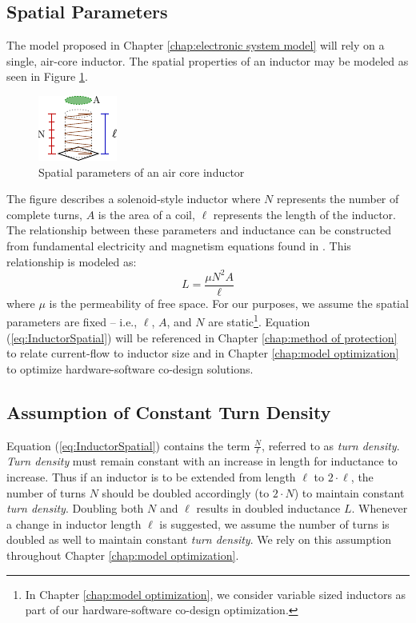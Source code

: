 \documentclass[11pt,oneside]{report}
\begin{document}
    \subsection*{Spatial Parameters}
    The model proposed in Chapter \ref{chap:electronic system model} will rely on a single, air-core inductor. The spatial properties of an inductor may be modeled as seen in Figure \ref{fig:InductorParams}.
    \begin{figure}
        \centering
        \includegraphics[width=0.25\linewidth]{img/Inductor_Parameters.pdf}
        \caption[Air Core Inductor Spatial Parameters]{Spatial parameters of an air core inductor}
        \label{fig:InductorParams}
    \end{figure}
    The figure describes a solenoid-style inductor where $N$ represents the number of complete turns, $A$ is the area of a coil, $\ell$ represents the length of the inductor. The relationship between these parameters and inductance can be constructed from fundamental electricity and magnetism equations found in \cite{uniphy}. This relationship is modeled as:
    \begin{equation}\label{eq:InductorSpatial}
    L = \frac{\mu N^{2}A}{\ell}
    \end{equation}
    where $\mu$ is the permeability of free space. For our purposes, we assume the spatial parameters are fixed -- i.e., $\ell$, $A$, and $N$ are static\footnote{In Chapter \ref{chap:model optimization}, we consider variable sized inductors as part of our hardware-software co-design optimization.}. Equation (\ref{eq:InductorSpatial}) will be referenced in Chapter \ref{chap:method of protection} to relate current-flow to inductor size and in Chapter \ref{chap:model optimization} to optimize hardware-software co-design solutions.
    \subsection*{Assumption of Constant Turn Density} \label{ssec:Assumption of Constant}
    Equation (\ref{eq:InductorSpatial}) contains the term $\frac{N}{\ell}$, referred to as \textit{turn density}. \textit{Turn density} must remain constant with an increase in length for inductance to increase. Thus if an inductor is to be extended from length $\ell$ to $2\cdot \ell$, the number of turns $N$ should be doubled accordingly (to $2\cdot N$) to maintain constant \textit{turn density}. Doubling both $N$ and $\ell$ results in doubled inductance $L$. Whenever a change in inductor length $\ell$ is suggested, we assume the number of turns is doubled as well to maintain constant \textit{turn density}. We rely on this assumption throughout Chapter \ref{chap:model optimization}.
\end{document}
